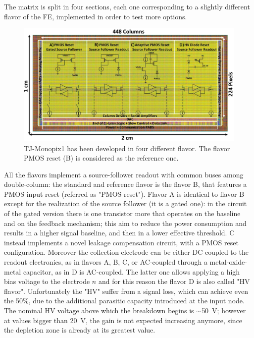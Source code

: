         The matrix is split in four sections, each one corresponding to a slightly different flavor of the FE, implemented in order to test more options. 
        \begin{figure}[h!]
            \centering
            \includegraphics[width=.8\linewidth]{figures/Monopix1/Monopix1_flavors.png}
            \caption{TJ-Monopix1 has been developed in four different flavor. The flavor PMOS reset (B) is considered as the reference one.
            }
            \label{fig:Monopix1_flavors}
        \end{figure}    
        All the flavors implement a source-follower readout with common buses among double-column: the standard and reference flavor is the flavor B, that features a PMOS input reset (referred as "PMOS reset"). Flavor A is identical to flavor B except for the realization of the source follower (it is a gated one): in the circuit of the gated version there is one transistor more that operates on the baseline and on the feedback mechanism; this aim to reduce the power consumption and results in a higher signal baseline, and then in a lower effective threshold.
        C instead implements a novel leakage compensation circuit, with a PMOS reset configuration. 
        Moreover the collection electrode can be either DC-coupled to the readout electronics, as in flavors A, B, C, or AC-coupled through a metal-oxide-metal capacitor, as in D is AC-coupled. The latter one allows applying a high bias voltage to the electrode $n$ and for this reason the flavor D is also called "HV flavor".
        Unfortunately the "HV" suffer from a signal loss, which can achieve even the 50\%, due to the additional parasitic capacity introduced at the input node.  
        The nominal HV voltage above which the breakdown begins is $\sim$\SI{50}{V}; however at values bigger than \SI{20}{V}, the gain is not expected increasing anymore, since the depletion zone is already at its greatest value. 

